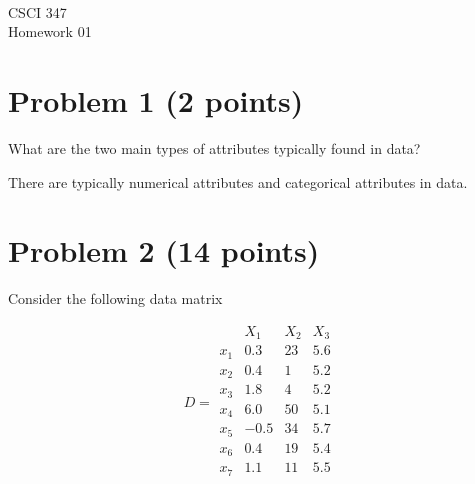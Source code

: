 \documentclass[11pt]{article}
\newcommand{\course}{CSCI 347}
\newcommand{\proj}{Homework 01}
\begin{document}
{ ~\\
    \course \\ 
    \proj \\ 
}

\section*{Problem 1 (2 points)}

What are the two main types of attributes typically found in data? 

There are typically numerical attributes and categorical attributes in data.

\section*{Problem 2 (14 points)}

Consider the following data matrix

$$
    D = \begin{matrix}
            & X_1   & X_2   & X_3 \\
        x_1 &  0.3  & 23    & 5.6 \\
        x_2 &  0.4  &  1    & 5.2 \\
        x_3 &  1.8  &  4    & 5.2 \\
        x_4 &  6.0  & 50    & 5.1 \\
        x_5 & -0.5  & 34    & 5.7 \\
        x_6 &  0.4  & 19    & 5.4 \\
        x_7 &  1.1  & 11    & 5.5 \\
    \end{matrix}
$$
\end{document}
